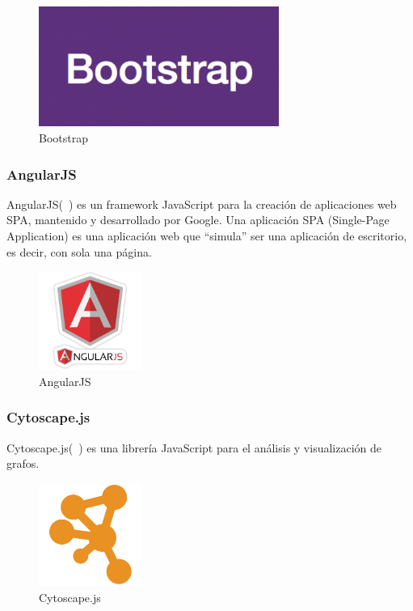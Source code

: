 \begin{figure}[tbh]
\centering
\label{fig:bootstrap}
\includegraphics[width=0.7\textwidth]{imagenes/bootstrap}
\caption{Bootstrap}
\end{figure}

\subsubsection*{AngularJS}
AngularJS(~\cite{angular}) es un framework JavaScript para la creación de aplicaciones web SPA, mantenido y desarrollado por Google. Una aplicación SPA (Single-Page Application) es una aplicación web que ``simula'' ser una aplicación de escritorio, es decir, con sola una página.

\begin{figure}[tbh]
\centering
\label{fig:angular}
\includegraphics[width=0.3\textwidth]{imagenes/angular}
\caption{AngularJS}
\end{figure}

\subsubsection*{Cytoscape.js}

Cytoscape.js(~\cite{cytoscape}) es una librería JavaScript para el análisis y visualización de grafos.

\begin{figure}[tbh]
\centering
\label{fig:cytoscape}
\includegraphics[width=0.3\textwidth]{imagenes/cytoscape}
\caption{Cytoscape.js}
\end{figure}

